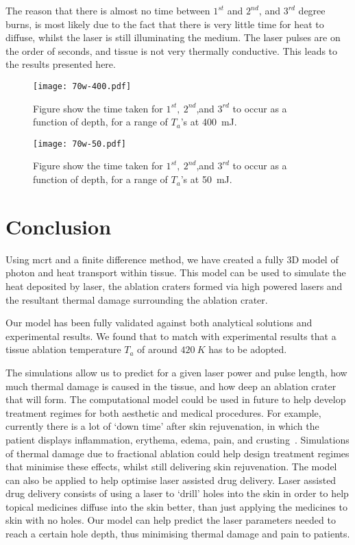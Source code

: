 The reason that there is almost no time between $1^{st}$ and $2^{nd}$, and $3^{rd}$ degree burns, is most likely due to the fact that there is very little time for heat to diffuse, whilst the laser is still illuminating the medium. The laser pulses are on the order of seconds, and tissue is not very thermally conductive. This leads to the results presented here.
	
\begin{figure}[!htb]
	\centering
	\texttt{[image: 70w-400.pdf]}
	\caption{Figure show the time taken for $1^{st},\ 2^{nd}$,and $3^{rd}$ to occur as a function of depth, for a range of $T_a$'s at 400~mJ.}
	\label{fig:time-thres1}
\end{figure}	
	
\begin{figure}[!htb]
	\centering
	\texttt{[image: 70w-50.pdf]}
	\caption{Figure show the time taken for $1^{st},\ 2^{nd}$,and $3^{rd}$ to occur as a function of depth, for a range of $T_a$'s at 50~mJ.}
	\label{fig:time-thres2}
\end{figure}	
\FloatBarrier
\section{Conclusion}

Using \gls{mcrt} and a finite difference method, we have created a fully 3D model of photon and heat transport within tissue. This model can be used to simulate the heat deposited by laser, the ablation craters formed via high powered lasers and the resultant thermal damage surrounding the ablation crater.

Our model has been fully validated against both analytical solutions and experimental results. We found that to match with experimental results that a tissue ablation temperature $T_a$ of around $420~K$ has to be adopted.

The simulations allow us to predict for a given laser power and pulse length, how much thermal damage is caused in the tissue, and how deep an ablation crater that will form. The computational model could be used in future to help develop treatment regimes for both aesthetic and medical procedures. For example, currently there is a lot of `down time' after skin rejuvenation, in which the patient displays inflammation, erythema, edema, pain, and crusting~\cite{lapidoth2014fractional,trelles2011safe,kohl2015fractional}. Simulations of thermal damage due to fractional ablation could help design treatment regimes that minimise these effects, whilst still delivering skin rejuvenation.
The model can also be applied to help optimise laser assisted drug delivery. Laser assisted drug delivery consists of using a laser to `drill' holes into the skin in order to help topical medicines diffuse into the skin better, than just applying the medicines to skin with no holes. Our model can help predict the laser parameters needed to reach a certain hole depth, thus minimising thermal damage and pain to patients.

